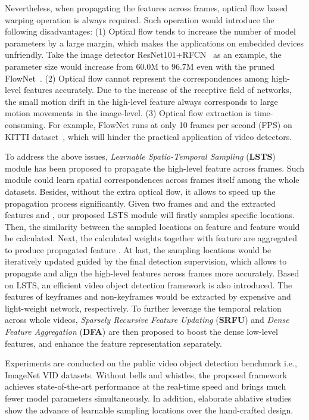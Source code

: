 \documentclass[runningheads]{llncs}
\begin{document}
Nevertheless, when propagating the features across frames, optical flow based warping operation is always required. Such operation would introduce the following disadvantages: (1) Optical flow tends to increase the number of model parameters by a large margin, which makes the applications on embedded devices unfriendly. Take the image detector ResNet101+RFCN~\cite{he2016deep,dai2016r} as an example, the parameter size would increase from 60.0M to 96.7M even with the pruned FlowNet~\cite{zhu2017deep}. (2) Optical flow cannot represent the correspondences among high-level features accurately. Due to the increase of the receptive field of networks, the small motion drift in the high-level feature always corresponds to large motion movements in the image-level. (3) Optical flow extraction is time-consuming. For example, FlowNet\cite{dosovitskiy2015flownet} runs at only 10 frames per second (FPS) on KITTI dataset~\cite{geiger2013vision}, which will hinder the practical application of video detectors.

To address the above issues, \textit{Learnable Spatio-Temporal Sampling} (\textbf{LSTS}) module has been proposed to propagate the high-level feature across frames. Such module could learn spatial correspondences across frames itself among the whole datasets. Besides, without the extra optical flow, it allows to speed up the propagation process significantly. Given two frames  and  and the extracted features  and , our proposed LSTS module will firstly samples specific locations. Then, the similarity between the sampled locations on feature  and feature  would be calculated. Next, the calculated weights together with feature  are aggregated to produce propagated feature . At last, the sampling locations would be iteratively updated guided by the final detection supervision, which allows to propagate and align the high-level features across frames more accurately. Based on LSTS, an efficient video object detection framework is also introduced. The features of keyframes and non-keyframes would be extracted by expensive and light-weight network, respectively. To further leverage the temporal relation across whole videos, \textit{Sparsely Recursive Feature Updating} (\textbf{SRFU}) and \textit{Dense Feature Aggregation} (\textbf{DFA}) are then proposed to boost the dense low-level features, and enhance the feature representation separately. 

Experiments are conducted on the public video object detection benchmark i.e., ImageNet VID datasets. Without bells and whistles, the proposed framework achieves state-of-the-art performance at the real-time speed and brings much fewer model parameters simultaneously. In addition, elaborate ablative studies show the advance of learnable sampling locations over the hand-crafted design. 
\end{document}
